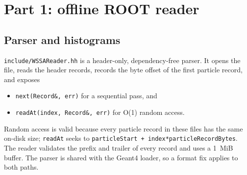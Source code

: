\documentclass[11pt,a4paper]{article}
\begin{document}
\section{Part 1: offline ROOT reader}\label{sec:part1}

\subsection{Parser and histograms}

\texttt{include/WSSAReader.hh} is a header-only, dependency-free parser.  It
opens the file, reads the header records, records the byte offset of the first
particle record, and exposes
\begin{itemize}
  \item \texttt{next(Record\&, err)} for a sequential pass, and
  \item \texttt{readAt(index, Record\&, err)} for O(1) random access.
\end{itemize}
Random access is valid because every particle record in these files has the
same on-disk size; \texttt{readAt} seeks to
\texttt{particleStart + index*particleRecordBytes}.  The reader validates the
prefix and trailer of every record and uses a 1~MiB buffer.  The parser is
shared with the Geant4 loader, so a format fix applies to both paths.
\end{document}
